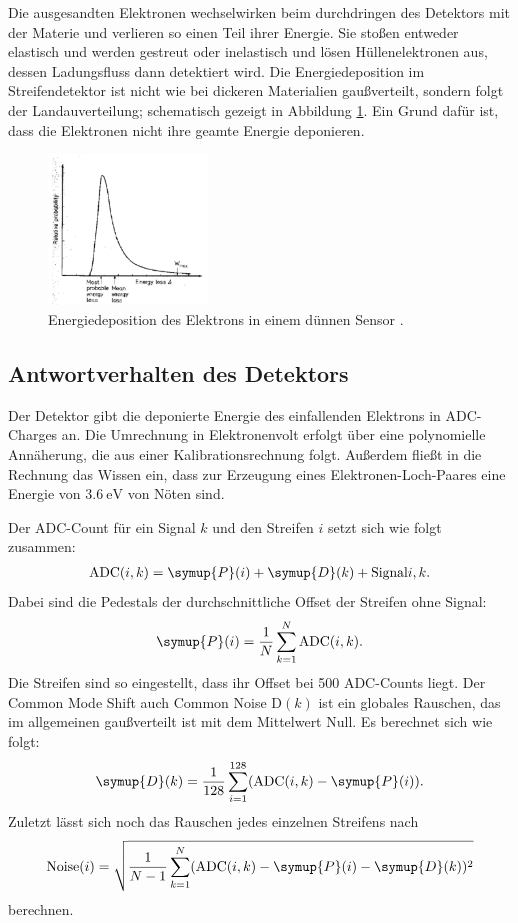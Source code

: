 Die ausgesandten Elektronen wechselwirken beim durchdringen des Detektors mit der Materie und verlieren so einen Teil ihrer Energie.
Sie stoßen entweder elastisch und werden gestreut oder inelastisch und lösen Hüllenelektronen aus, dessen Ladungsfluss dann detektiert wird.
Die Energiedeposition im Streifendetektor ist nicht wie bei dickeren Materialien gaußverteilt, sondern folgt der Landauverteilung; schematisch gezeigt in Abbildung \ref{fig:energiedepositionElektron}. Ein Grund dafür ist, dass die Elektronen nicht ihre geamte Energie deponieren.
\begin{figure}
  \centering
  \includegraphics[height=4cm]{TimosAufrisse/energiedepositionElektron.png}
  \caption{Energiedeposition des Elektrons in einem dünnen Sensor \cite{anleitung}.}
  \label{fig:energiedepositionElektron}
\end{figure}

\subsection{Antwortverhalten des Detektors}

Der Detektor gibt die deponierte Energie des einfallenden Elektrons in ADC-Charges an. Die Umrechnung in Elektronenvolt erfolgt über eine polynomielle Annäherung, die aus einer Kalibrationsrechnung folgt. Außerdem fließt in die Rechnung das Wissen ein, dass zur Erzeugung eines Elektronen-Loch-Paares eine Energie von $\SI{3.6}{\electronvolt}$ von Nöten sind.

Der ADC-Count für ein Signal $k$ und den Streifen $i$ setzt sich wie folgt zusammen:
\begin{align}
  \text{ADC}(i, k) = \symup{P}(i) + \symup{D}(k) + \text{Signal}{i, k}.
\end{align}
Dabei sind die Pedestals der durchschnittliche Offset der Streifen ohne Signal:
\begin{align}
  \symup{P}(i) = \frac{1}{N} \sum_{k=1}^N \text{ADC}(i, k).
\end{align}
Die Streifen sind so eingestellt, dass ihr Offset bei \num{500} ADC-Counts liegt.
Der Common Mode Shift auch Common Noise D$(k)$ ist ein globales Rauschen, das im allgemeinen gaußverteilt ist mit dem Mittelwert Null. Es berechnet sich wie folgt:
\begin{align}
  \symup{D}(k) = \frac{1}{128} \sum_{i=1}^{128} (\text{ADC}(i, k) - \symup{P}(i)).
\end{align}
Zuletzt lässt sich noch das Rauschen jedes einzelnen Streifens nach
\begin{align}
  \text{Noise}(i) = \sqrt{\frac{1}{N-1} \sum_{k=1}^N(\text{ADC}(i, k) - \symup{P}(i) - \symup{D}(k))^2}
\end{align}
berechnen.

